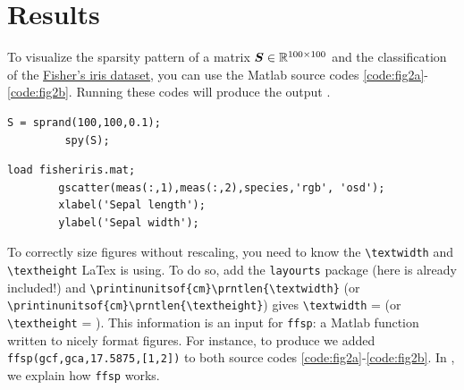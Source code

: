 
\section{Results \label{sec:results}}
	
	To visualize the sparsity pattern of a matrix \(\mat{S}\in\mathbb{R}^{100\times 100}\) and the classification of the \href{https://en.wikipedia.org/wiki/Iris_flower_data_set}{Fisher's iris dataset}, you can use the Matlab source codes \ref{code:fig2a}-\ref{code:fig2b}. Running these codes will produce the output .
	
	\begin{lstlisting}[style=Matlab-editor, caption={Matlab code for \reffig{fig:sparsity}}, label=code:fig2a]
		 S = sprand(100,100,0.1);
		 spy(S);
	\end{lstlisting}
		
	\begin{lstlisting}[style=Matlab-editor, caption={Matlab code for \reffig{fig:classification}}, label=code:fig2b]
		load fisheriris.mat; 
		gscatter(meas(:,1),meas(:,2),species,'rgb', 'osd');
		xlabel('Sepal length');
		ylabel('Sepal width');
	\end{lstlisting}
	
	To correctly size figures without rescaling, you need to know the \verb*|\textwidth| and  \verb*|\textheight| LaTex is using. 
	To do so, add the \verb*|layourts| package (here is already included!) and \verb*|\printinunitsof{cm}\prntlen{\textwidth}| (or \verb*|\printinunitsof{cm}\prntlen{\textheight}|) gives \verb*|\textwidth| = \prntlen{\textwidth} (or \verb*|\textheight| = \prntlen{\textheight}).
	This information is an input for \verb*|ffsp|: a Matlab function written to nicely format figures. 
	For instance, to produce  we added \verb*|ffsp(gcf,gca,17.5875,[1,2])| to both source codes \ref{code:fig2a}-\ref{code:fig2b}.
	In , we explain how \verb*|ffsp| works.
	
